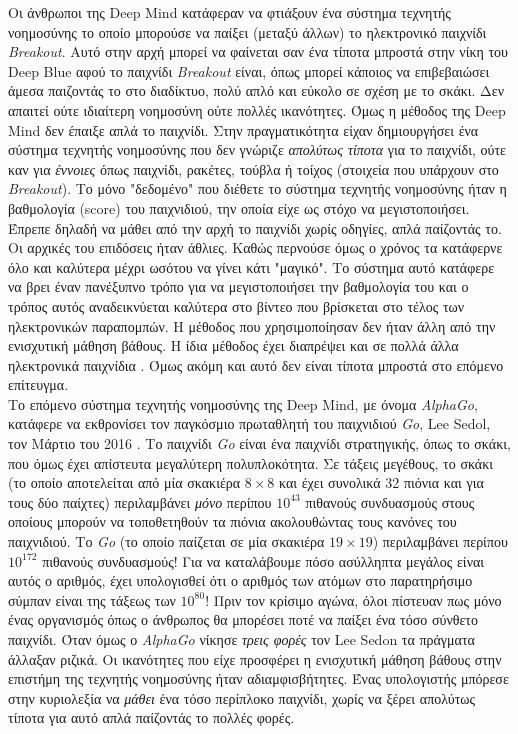 \documentclass[11pt]{article} %
\numberwithin{equation}{subsection}
\begin{document}
Οι άνθρωποι της Deep Mind κατάφεραν να φτιάξουν ένα σύστημα τεχνητής νοημοσύνης το οποίο μπορούσε να παίξει (μεταξύ άλλων) το ηλεκτρονικό παιχνίδι \textit{Breakout}. Αυτό στην αρχή μπορεί να φαίνεται σαν ένα τίποτα μπροστά στην νίκη του Deep Blue αφού το παιχνίδι \textit{Breakout} είναι, όπως μπορεί κάποιος να επιβεβαιώσει άμεσα παιζοντάς το στο διαδίκτυο, πολύ απλό και εύκολο σε σχέση με το σκάκι. Δεν απαιτεί ούτε ιδιαίτερη νοημοσύνη ούτε πολλές ικανότητες. Όμως η μέθοδος της Deep Mind δεν έπαιξε απλά το παιχνίδι. Στην πραγματικότητα είχαν δημιουργήσει ένα σύστημα τεχνητής νοημοσύνης που δεν γνώριζε \textit{απολύτως τίποτα} για το παιχνίδι, ούτε καν για \textit{έννοιες} όπως παιχνίδι, ρακέτες, τούβλα ή τοίχος \cite{max} (στοιχεία που υπάρχουν στο \textit{Breakout}). Το μόνο "δεδομένο" που διέθετε το σύστημα τεχνητής νοημοσύνης ήταν η βαθμολογία (score) του παιχνιδιού, την οποία είχε ως στόχο να μεγιστοποιήσει. Έπρεπε δηλαδή να μάθει από την αρχή το παιχνίδι χωρίς οδηγίες, απλά παίζοντάς το. Οι αρχικές του επιδόσεις ήταν άθλιες. Καθώς περνούσε όμως ο χρόνος τα κατάφερνε όλο και καλύτερα μέχρι ωσότου να γίνει κάτι "μαγικό". Το σύστημα αυτό κατάφερε να βρει έναν πανέξυπνο τρόπο για να μεγιστοποιήσει την βαθμολογία του και ο τρόπος αυτός αναδεικνύεται καλύτερα στο βίντεο που βρίσκεται στο τέλος των ηλεκτρονικών παραπομπών. Η μέθοδος που χρησιμοποίησαν δεν ήταν άλλη από την ενισχυτική μάθηση βάθους. Η ίδια μέθοδος έχει διαπρέψει και σε πολλά άλλα ηλεκτρονικά παιχνίδια \cite{atari}. Όμως ακόμη και αυτό δεν είναι τίποτα μπροστά στο επόμενο επίτευγμα.\\

Το επόμενο σύστημα τεχνητής νοημοσύνης της Deep Mind, με όνομα \textit{AlphaGo}, κατάφερε να εκθρονίσει τον παγκόσμιο πρωταθλητή του παιχνιδιού \textit{Go}, Lee Sedol, τον Μάρτιο του 2016 \cite{max}. Το παιχνίδι \textit{Go} είναι ένα παιχνίδι στρατηγικής, όπως το σκάκι, που όμως έχει απίστευτα μεγαλύτερη πολυπλοκότητα. Σε τάξεις μεγέθους, το σκάκι (το οποίο αποτελείται από μία σκακιέρα $8 \times 8$ και έχει συνολικά 32 πιόνια και για τους δύο παίχτες) περιλαμβάνει \textit{μόνο} περίπου $10 ^ {43}$ πιθανούς συνδυασμούς στους οποίους μπορούν να τοποθετηθούν τα πιόνια ακολουθώντας τους κανόνες του παιχνιδιού. Το \textit{Go} (το οποίο παίζεται σε μία σκακιέρα $19 \times 19$) περιλαμβάνει περίπου \textit{$10 ^ {172}$} πιθανούς συνδυασμούς! Για να καταλάβουμε πόσο ασύλληπτα μεγάλος είναι αυτός ο αριθμός, έχει υπολογισθεί ότι ο αριθμός των ατόμων στο παρατηρήσιμο σύμπαν είναι της τάξεως των $10 ^{80}$! Πριν τον κρίσιμο αγώνα, όλοι πίστευαν πως μόνο ένας οργανισμός όπως ο άνθρωπος θα μπορέσει ποτέ να παίξει ένα τόσο σύνθετο παιχνίδι. Όταν όμως ο \textit{AlphaGo} νίκησε \textit{τρεις φορές} τον Lee Sedon τα πράγματα άλλαξαν ριζικά. Οι ικανότητες που είχε προσφέρει η ενισχυτική μάθηση βάθους στην επιστήμη της τεχνητής νοημοσύνης ήταν αδιαμφισβήτητες. Ένας υπολογιστής μπόρεσε στην κυριολεξία να \textit{μάθει} ένα τόσο περίπλοκο παιχνίδι, χωρίς να ξέρει απολύτως τίποτα για αυτό απλά παίζοντάς το πολλές φορές. \\
\end{document}
